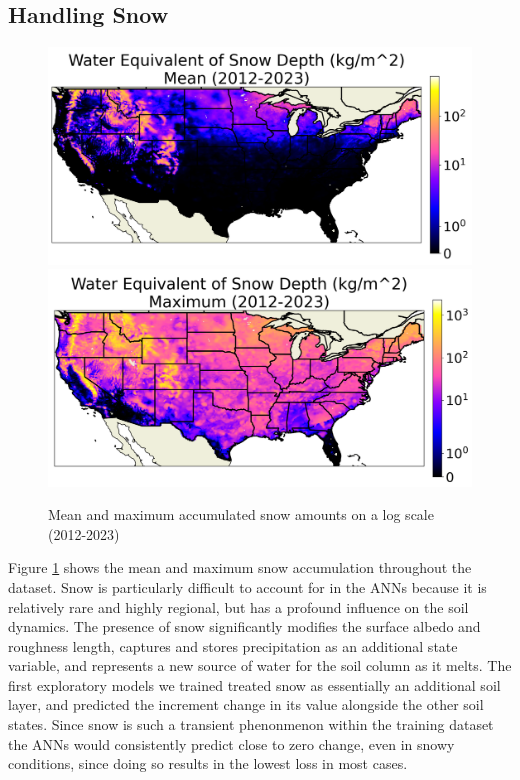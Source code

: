 \subsection{Handling Snow}

\begin{figure}[hb!]
    \centering
    \includegraphics[width=.48\linewidth]{figures/thesis-gridstats/gridstat-bulk_weasd-log_2012-1_2023-12_y000-195_x000-462_mean.png}
    \includegraphics[width=.48\linewidth]{figures/thesis-gridstats/gridstat-bulk_weasd-log_2012-1_2023-12_y000-195_x000-462_max.png}
    \caption{Mean and maximum accumulated snow amounts on a log scale (2012-2023)}
    \label{gs-snow}
\end{figure}

Figure \ref{gs-snow} shows the mean and maximum snow accumulation throughout the dataset. Snow is particularly difficult to account for in the ANNs because it is relatively rare and highly regional, but has a profound influence on the soil dynamics. The presence of snow significantly modifies the surface albedo and roughness length, captures and stores precipitation as an additional state variable, and represents a new source of water for the soil column as it melts. The first exploratory models we trained treated snow as essentially an additional soil layer, and predicted the increment change in its value alongside the other soil states. Since snow is such a transient phenonmenon within the training dataset the ANNs would consistently predict close to zero change, even in snowy conditions, since doing so results in the lowest loss in most cases.


